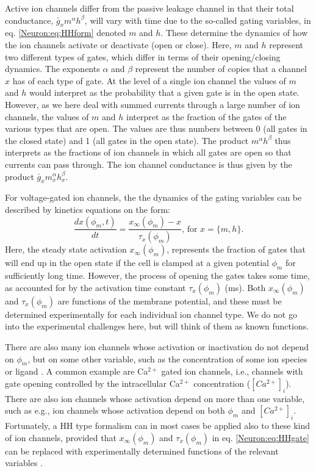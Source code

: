 Active ion channels differ from the passive leakage channel in that their total conductance, $\bar{g}_{x} m^{\alpha} h^{\beta}$, will vary with time due to the so-called gating variables, in eq. \ref{Neuron:eq:HHform} denoted $m$ and $h$. These determine the dynamics of how the ion channels activate or deactivate (open or close). Here, $m$ and $h$ represent two different types of gates, which differ in terms of their opening/closing dynamics. The exponents $\alpha$ and $\beta$ represent the number of copies that a channel $x$ has of each type of gate. At the level of a single ion channel the values of $m$ and $h$ would interpret as the probability that a given gate is in the open state. However, as we here deal with summed currents through a large number of ion channels, the values of $m$ and $h$ interpret as the fraction of the gates of the various types that are open. The values are thus numbers between 0 (all gates in the closed state) and 1 (all gates in the open state). The product $m^{\alpha} h^{\beta}$ thus interprets as the fractions of ion channels in which all gates are open so that currents can pass through. The ion channel conductance is thus given by the product $\bar{g}_x m_x^{\alpha} h_x^{\beta}$.

For voltage-gated ion channels, the the dynamics of the gating variables can be described by kinetics equations on the form:
\begin{equation}
\frac{dx(\phi_m,t)}{dt} = \frac{x_{\infty}(\phi_m) - x}{\tau_x(\phi_m)},  \, \text{for } x = \{m,h\}.
\label{Neuron:eq:HHgate}
\end{equation}
Here, the steady state activation $x_{\infty}(\phi_m)$, represents the fraction of gates that will end up in the open state if the cell is clamped at a given potential $\phi_m$ for sufficiently long time. However, the process of opening the gates takes some time, as accounted for by the activation time constant $\tau_x(\phi_m)$ (ms). Both $x_{\infty}(\phi_m)$ and $\tau_x(\phi_m)$ are functions of the membrane potential, and these must be determined experimentally for each individual ion channel type. We do not go into the experimental challenges here, but will think of them as known functions. 

There are also many ion channels whose activation or inactivation do not depend on $\phi_m$, but on some other variable, such as the concentration of some ion species or ligand \cite{Hille2001,Sterratt2011}. A common example are Ca$^{2+}$ gated ion channels, i.e., channels with gate opening controlled by the intracellular Ca$^{2+}$ concentration ($[Ca^{2+}]_i$). There are also ion channels whose activation depend on more than one variable, such as e.g., ion channels whose activation depend on both $\phi_m$ and $[Ca^{2+}]_i$. Fortunately, a HH type formalism can in most cases be applied also to these kind of ion channels, provided that $x_{\infty}(\phi_m)$ and $\tau_x(\phi_m)$ in eq. \ref{Neuron:eq:HHgate} can be replaced with experimentally determined functions of the relevant variables \cite{Sterratt2011}. 



